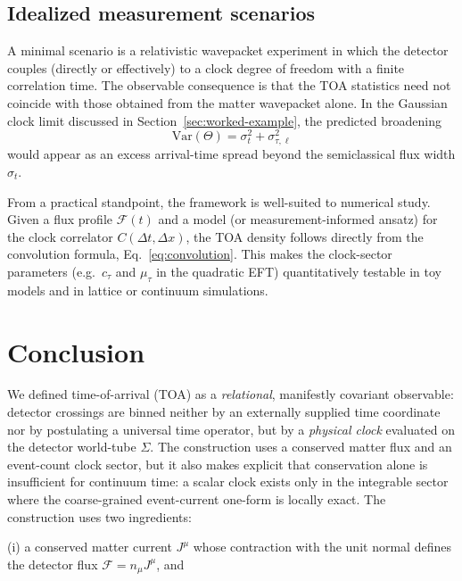 \documentclass[pdflatex,sn-mathphys-num]{sn-jnl}
\theoremstyle{thmstylethree}
\theoremstyle{thmstyleone}
\theoremstyle{thmstyletwo}
\numberwithin{equation}{section}
\begin{document}
    \subsection*{Idealized measurement scenarios}
    
    A minimal scenario is a relativistic wavepacket experiment in which the detector couples (directly or effectively) to a clock degree of freedom with a finite correlation time. The observable consequence is that the TOA statistics need not coincide with those obtained from the matter wavepacket alone. In the Gaussian clock limit discussed in Section~\ref{sec:worked-example}, the predicted broadening
    \begin{equation}
        \mathrm{Var}(\Theta)=\sigma_t^2+\sigma_{\tau,\ell}^2
    \end{equation}
    would appear as an excess arrival-time spread beyond the semiclassical flux width $\sigma_t$.
    
    From a practical standpoint, the framework is well-suited to numerical study. Given a flux profile $\mathcal{F}(t)$ and a model (or measurement-informed ansatz) for the clock correlator $C(\Delta t,\Delta x)$, the TOA density follows directly from the convolution formula, Eq.~\eqref{eq:convolution}. This makes the clock-sector parameters (e.g.\ $c_\tau$ and $\mu_\tau$ in the quadratic EFT) quantitatively testable in toy models and in lattice or continuum simulations.

    \section{Conclusion}
    
    We defined time-of-arrival (TOA) as a \emph{relational}, manifestly covariant observable: detector crossings are binned neither by an externally supplied time coordinate nor by postulating a universal time operator, but by a \emph{physical clock} evaluated on the detector world-tube $\Sigma$. The construction uses a conserved matter flux and an event-count clock sector, but it also makes explicit that conservation alone is insufficient for continuum time: a scalar clock exists only in the integrable sector where the coarse-grained event-current one-form is locally exact. The construction uses two ingredients:
    
    \smallskip
    \noindent
    (i) a conserved matter current $J^\mu$ whose contraction with the unit normal defines the detector flux $\mathcal{F}=n_\mu J^\mu$, and
    
\end{document}
